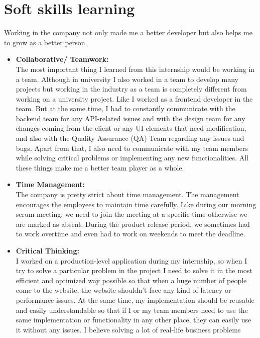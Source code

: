 \section{Soft skills learning}
\begin{flushleft}
Working in the company not only made me a better developer but also helps me to grow as a
better person.
\begin{itemize}
    \item \textbf{Collaborative/ Teamwork:}\\
    \vspace{6pt}
The most important thing I learned from this internship would be working in a team.
Although in university I also worked in a team to develop many projects but working in
the industry as a team is completely different from working on a university project. Like I
worked as a frontend developer in the team. But at the same time, I had to constantly
communicate with the backend team for any API-related issues and with the design
team for any changes coming from the client or any UI elements that need modification,
and also with the Quality Assurance (QA) Team regarding any issues and bugs. Apart
from that, I also need to communicate with my team members while solving critical
problems or implementing any new functionalities. All these things make me a better
team player as a whole.
\item \textbf{Time Management:}\\
\vspace{6pt}
The company is pretty strict about time management. The management encourages the
employees to maintain time carefully. Like during our morning scrum meeting, we need
to join the meeting at a specific time otherwise we are marked as absent. During the
product release period, we sometimes had to work overtime and even had to work on
weekends to meet the deadline.
\item \textbf{Critical Thinking:}\\
\vspace{6pt}
I worked on a production-level application during my internship, so when I try to solve a
particular problem in the project I need to solve it in the most efficient and optimized way
possible so that when a huge number of people come to the website, the website
shouldn’t face any kind of latency or performance issues. At the same time, my
implementation should be reusable and easily understandable so that if I or my team
members need to use the same implementation or functionality in any other place, they
can easily use it without any issues. I believe solving a lot of real-life business problems

\end{itemize}
\end{flushleft}
